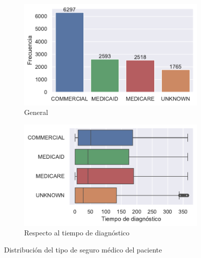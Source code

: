 \begin{itemize}[leftmargin=*]
	\begin{figure}[h]
		\begin{center}
			\begin{subfigure}{0.45\linewidth}
				\begin{center}
					\includegraphics[width=\linewidth]{figs/chapter3/categorical/payertypedistribution.pdf}
					\caption{General}\label{fig:ch3payertypedist}
				\end{center}
			\end{subfigure} 
			\begin{subfigure}{0.45\linewidth}
				\begin{center}
					\includegraphics[width=\linewidth]{figs/chapter3/categorical/payertypeperiod.pdf}
					\caption{Respecto al tiempo de diagnóstico}\label{fig:ch3payertypeperiod}
				\end{center}
			\end{subfigure} 
		\end{center}
		\captionsetup{aboveskip=-5pt, belowskip=-15pt}
		\caption{Distribución del tipo de seguro médico del paciente}
		\label{fig:ch3payertype}
	\end{figure}
	

\end{itemize}
